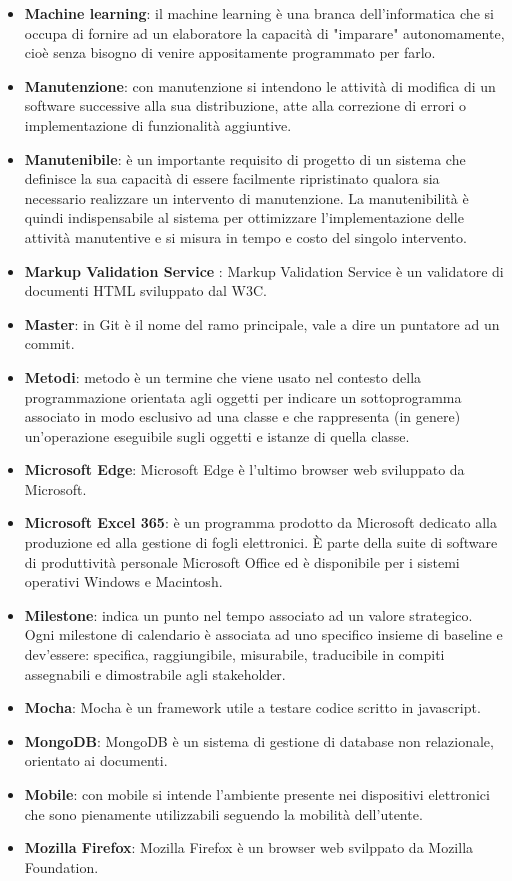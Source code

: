 \documentclass[a4paper, oneside, openany]{article}
\begin{document}
\begin{itemize}
\item \textbf{Machine learning}: il machine learning è una branca dell'informatica che si occupa di fornire ad un elaboratore la capacità di "imparare" autonomamente, cioè senza bisogno di venire appositamente programmato per farlo.
\item \textbf{Manutenzione}: con manutenzione si intendono le attività di modifica di un software successive alla sua distribuzione, atte alla correzione di errori o implementazione di funzionalità aggiuntive.
\item \textbf{Manutenibile}: è un importante requisito di progetto di un sistema che definisce la sua capacità di essere facilmente ripristinato qualora sia necessario realizzare un intervento di manutenzione. La manutenibilità è quindi indispensabile al sistema per ottimizzare l'implementazione delle attività manutentive e si misura in tempo e costo del singolo intervento.
\item \textbf{Markup Validation Service }: Markup Validation Service è un validatore di documenti HTML sviluppato dal W3C.
\item \textbf{Master}: in Git è il nome del ramo principale, vale a dire un puntatore ad un commit.
\item \textbf{Metodi}: metodo è un termine che viene usato nel contesto della programmazione orientata agli oggetti per indicare un sottoprogramma associato in modo esclusivo ad una classe e che rappresenta (in genere) un'operazione eseguibile sugli oggetti e istanze di quella classe.
\item \textbf{Microsoft Edge}: Microsoft Edge è l'ultimo browser web sviluppato da Microsoft.
\item \textbf{Microsoft Excel 365}: è un programma prodotto da Microsoft dedicato alla produzione ed alla gestione di fogli elettronici. È parte della suite di software di produttività personale Microsoft Office ed è disponibile per i sistemi operativi Windows e Macintosh.
\item \textbf{Milestone}: indica un punto nel tempo associato ad un valore strategico. Ogni milestone di calendario è associata ad uno specifico insieme di baseline e dev'essere: specifica, raggiungibile, misurabile, traducibile in compiti assegnabili e dimostrabile agli stakeholder.
\item \textbf{Mocha}: Mocha è un framework utile a testare codice scritto in javascript.
\item \textbf{MongoDB}: MongoDB è un sistema di gestione di database non relazionale, orientato ai documenti.
\item \textbf{Mobile}: con mobile si intende l'ambiente presente nei dispositivi elettronici che sono pienamente utilizzabili seguendo la mobilità dell'utente.
\item \textbf{Mozilla Firefox}: Mozilla Firefox è un browser web svilppato da Mozilla Foundation.
\end{itemize}
\end{document}
